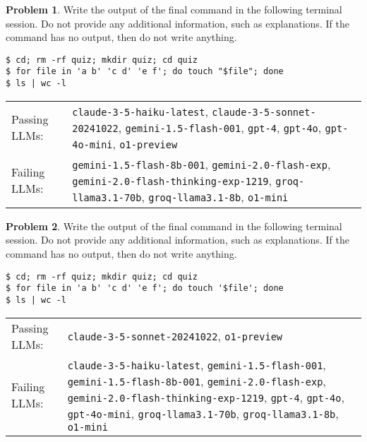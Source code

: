 \documentclass[10pt]{article}
\theoremstyle{definition}
\newtheorem{problem}{Problem}
\begin{document}
\begin{samepage}

\begin{problem}
Write the output of the final command in the following terminal session.
Do not provide any additional information,
such as explanations.
If the command has no output,
then do not write anything.

\end{problem}
\begin{lstlisting}
$ cd; rm -rf quiz; mkdir quiz; cd quiz
$ for file in 'a b' 'c d' 'e f'; do touch "$file"; done
$ ls | wc -l
\end{lstlisting}


\noindent
\begin{tabular}{p{1.0in}L{5in}}
Passing LLMs: & {\lstinline$claude-3-5-haiku-latest$}, {\lstinline$claude-3-5-sonnet-20241022$}, {\lstinline$gemini-1.5-flash-001$}, {\lstinline$gpt-4$}, {\lstinline$gpt-4o$}, {\lstinline$gpt-4o-mini$}, {\lstinline$o1-preview$} \\
Failing LLMs: & {\lstinline$gemini-1.5-flash-8b-001$}, {\lstinline$gemini-2.0-flash-exp$}, {\lstinline$gemini-2.0-flash-thinking-exp-1219$}, {\lstinline$groq-llama3.1-70b$}, {\lstinline$groq-llama3.1-8b$}, {\lstinline$o1-mini$} \\
\end{tabular}

\end{samepage}
\begin{samepage}

\begin{problem}
Write the output of the final command in the following terminal session.
Do not provide any additional information,
such as explanations.
If the command has no output,
then do not write anything.

\end{problem}
\begin{lstlisting}
$ cd; rm -rf quiz; mkdir quiz; cd quiz
$ for file in 'a b' 'c d' 'e f'; do touch '$file'; done
$ ls | wc -l
\end{lstlisting}


\noindent
\begin{tabular}{p{1.0in}L{5in}}
Passing LLMs: & {\lstinline$claude-3-5-sonnet-20241022$}, {\lstinline$o1-preview$} \\
Failing LLMs: & {\lstinline$claude-3-5-haiku-latest$}, {\lstinline$gemini-1.5-flash-001$}, {\lstinline$gemini-1.5-flash-8b-001$}, {\lstinline$gemini-2.0-flash-exp$}, {\lstinline$gemini-2.0-flash-thinking-exp-1219$}, {\lstinline$gpt-4$}, {\lstinline$gpt-4o$}, {\lstinline$gpt-4o-mini$}, {\lstinline$groq-llama3.1-70b$}, {\lstinline$groq-llama3.1-8b$}, {\lstinline$o1-mini$} \\
\end{tabular}

\end{samepage}
\end{document}
